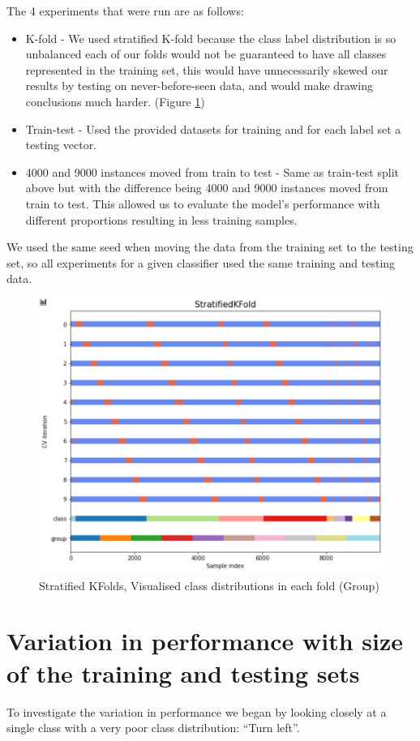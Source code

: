 \documentclass[11pt]{article}
\begin{document}
The 4 experiments that were run are as follows:
\begin{itemize}
  \item K-fold - We used stratified K-fold because the class label distribution is so unbalanced each of our folds would not be guaranteed to have all classes represented in the training set, this would have unnecessarily skewed our results by testing on never-before-seen data, and would make drawing conclusions much harder. (Figure \ref{StratKFold})
  \item Train-test - Used the provided datasets for training and for each label set a testing vector. 
  \item 4000 and 9000 instances moved from train to test - Same as train-test split above but with the difference being 4000  and 9000 instances moved from train to test. This allowed us to evaluate the model’s performance with different proportions resulting in less training samples.
\end{itemize}

We used the same seed when moving the data from the training set to the testing set, so all experiments for a given classifier used the same training and testing data.

\begin{figure}[H]
  \centering 
  \includegraphics[width = \textwidth, height = 0.5\textwidth, keepaspectratio]{Images/StratKFold.png} 
  \caption {Stratified KFolds, Visualised class distributions in each fold (Group)} \label{StratKFold}
\end{figure}

\section{Variation in performance with size of the training and testing sets}
To investigate the variation in performance we began by looking closely at a single class with a very poor class distribution: “Turn left”.
\end{document}
